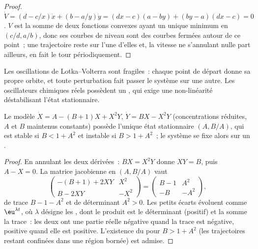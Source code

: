 \begin{proof}
$\dot V = (d - c/x)\dot x + (b - a/y)\dot y = (dx - c)(a - by) + (by - a)(dx - c) = 0$. $V$ est
la somme de deux fonctions convexes ayant un unique minimum en
$(c/d, a/b)$, donc ses courbes de niveau sont des courbes fermées autour
de ce point~; une trajectoire reste sur l'une d'elles et, la vitesse ne
s'annulant nulle part ailleurs, en fait le tour périodiquement.
\end{proof}

Les oscillations de Lotka--Volterra sont fragiles~: chaque point de
départ donne sa propre orbite, et toute perturbation fait passer le
système sur une autre. Les oscillateurs chimiques réels possèdent un
, qui exige une non-linéarité déstabilisant l'état
stationnaire.

\begin{proposition}\label{prop:b3:complex-kinetics:hopf}
Le modèle $\dot X = A - (B + 1)X + X^2Y$, $\dot Y = BX - X^2Y$
(concentrations réduites,
$A$ et $B$ maintenus constants) possède l'unique état stationnaire
$(A, B/A)$, qui est stable si $B < 1 + A^2$ et instable si
$B > 1 + A^2$~; le système se fixe alors sur un .
\end{proposition}

\begin{proof}
En annulant les deux dérivées~: $BX = X^2Y$ donne $XY = B$, puis $A - X = 0$.
La matrice jacobienne en $(A, B/A)$ vaut
\[
  \begin{pmatrix} -(B + 1) + 2XY & X^2 \\ B - 2XY & -X^2 \end{pmatrix}
  = \begin{pmatrix} B - 1 & A^2 \\ -B & -A^2 \end{pmatrix},
\]
de trace $B - 1 - A^2$ et de déterminant $A^2 > 0$. Les petits écarts
évoluent comme
$\eu^{\lambda t}$, où $\lambda$ désigne les , dont le
produit est le déterminant (positif)
et la somme la trace~: les deux ont une partie réelle négative quand la
trace est négative, positive quand elle est positive. L'existence du
 pour $B > 1 + A^2$ (les trajectoires restant confinées dans
une région bornée) est admise.
\end{proof}


